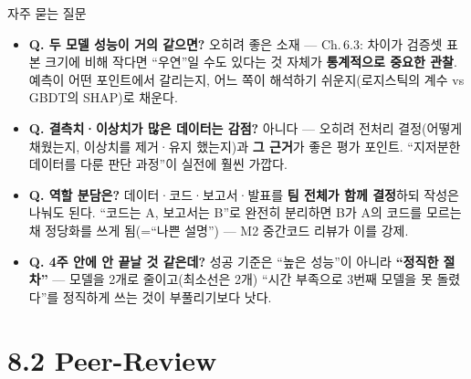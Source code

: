 \documentclass[aspectratio=169,11pt]{beamer}
\begin{document}
\begin{frame}{자주 묻는 질문}
  \begin{itemize}
    \item \textbf{Q. 두 모델 성능이 거의 같으면?} 오히려 좋은 소재
      --- Ch.\,6.3: 차이가 검증셋 표본 크기에 비해 작다면
      ``우연''일 수도 있다는 것 자체가 \textbf{통계적으로 중요한
      관찰}. 예측이 어떤 포인트에서 갈리는지, 어느 쪽이 해석하기
      쉬운지(로지스틱의 계수 vs GBDT의 SHAP)로 채운다.
    \item \textbf{Q. 결측치·이상치가 많은 데이터는 감점?} 아니다
      --- 오히려 전처리 결정(어떻게 채웠는지, 이상치를 제거·유지
      했는지)과 \textbf{그 근거}가 좋은 평가 포인트. ``지저분한
      데이터를 다룬 판단 과정''이 실전에 훨씬 가깝다.
    \item \textbf{Q. 역할 분담은?} 데이터·코드·보고서·발표를
      \textbf{팀 전체가 함께 결정}하되 작성은 나눠도 된다.
      ``코드는 A, 보고서는 B''로 완전히 분리하면 B가 A의 코드를
      모르는 채 정당화를 쓰게 됨(=``나쁜 설명'') --- M2
      중간코드 리뷰가 이를 강제.
    \item \textbf{Q. 4주 안에 안 끝날 것 같은데?} 성공 기준은
      ``높은 성능''이 아니라 \textbf{``정직한 절차''} --- 모델을
      2개로 줄이고(최소선은 2개) ``시간 부족으로 3번째 모델을
      못 돌렸다''를 정직하게 쓰는 것이 부풀리기보다 낫다.
  \end{itemize}
\end{frame}

\section{8.2 Peer-Review}

\end{document}
